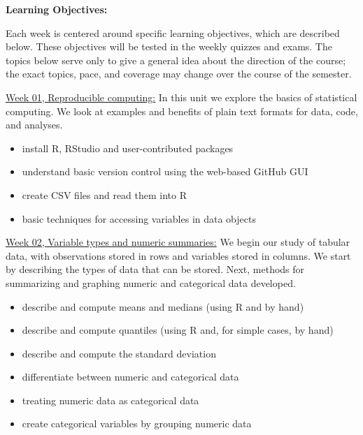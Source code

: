 \documentclass[12pt]{article}
\begin{document}
\newpage

\textbf{Learning Objectives:} \vspace{6pt}

Each week is centered around specific learning objectives,
which are described below. These objectives will be tested
in the weekly quizzes and exams. The topics below serve only
to give a general idea about the direction of the course; the
exact topics, pace, and coverage may change over the course of
the semester.

\vspace{1.0cm}

\def\labelitemi{}
\def\labelitemii{}

\underline{Week 01, Reproducible computing:}
In this unit we explore the basics of statistical computing.
We look at examples and benefits of plain text formats for data,
code, and analyses.
\begin{itemize}\setlength\itemsep{0em}
\item
  install R, RStudio and user-contributed packages
\item
  understand basic version control using the web-based GitHub GUI
\item
  create CSV files and read them into R
\item basic techniques for accessing variables in data objects
\end{itemize}

\bigskip

\underline{Week 02, Variable types and numeric summaries:}
We begin our study of tabular data, with observations stored in rows and
variables stored in columns. We start by describing the types of
data that can be stored. Next, methods for summarizing and graphing
numeric and categorical data developed.
\begin{itemize}\setlength\itemsep{0em}
\item
  describe and compute means and medians (using R and by hand)
\item
  describe and compute quantiles (using R and, for simple cases, by
  hand)
\item
  describe and compute the standard deviation
\item
  differentiate between numeric and categorical data
\item
  treating numeric data as categorical data
\item
  create categorical variables by grouping numeric data
\end{itemize}
\end{document}
